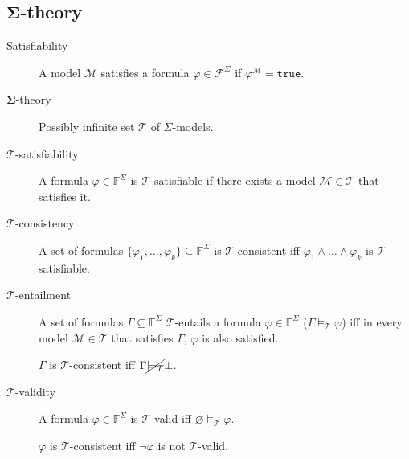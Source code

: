 \subsection{$\mathbf{\Sigma}$-theory}

\begin{description}
    \item[Satisfiability] 
        A model $\mathcal{M}$ satisfies a formula $\varphi \in \mathcal{F}^\Sigma$ if $\varphi^\mathcal{M} = \texttt{true}$.

    \item[$\mathbf{\Sigma}$-theory] 
        Possibly infinite set $\mathcal{T}$ of $\Sigma$-models.

    \item[$\mathbf{\mathcal{T}}$-satisfiability] 
        A formula $\varphi \in \mathbb{F}^\Sigma$ is $\mathcal{T}$-satisfiable if there exists a model $\mathcal{M} \in \mathcal{T}$ that satisfies it.

    \item[$\mathbf{\mathcal{T}}$-consistency] 
        A set of formulas $\{ \varphi_1, \dots, \varphi_k \} \subseteq \mathbb{F}^\Sigma$ is $\mathcal{T}$-consistent iff 
        $\varphi_1 \land \dots \land \varphi_k$ is $\mathcal{T}$-satisfiable.

    \item[$\mathbf{\mathcal{T}}$-entailment] 
        A set of formulas $\Gamma \subseteq \mathbb{F}^\Sigma$ $\mathcal{T}$-entails a formula $\varphi \in \mathbb{F}^\Sigma$ ($\Gamma \models_\mathcal{T} \varphi$) iff
        in every model $\mathcal{M} \in \mathcal{T}$ that satisfies $\Gamma$, $\varphi$ is also satisfied.

        \begin{remark}
            $\Gamma$ is $\mathcal{T}$-consistent iff $\Gamma \cancel{\models_\mathcal{T}} \bot$.
        \end{remark}

    \item[$\mathbf{\mathcal{T}}$-validity] 
        A formula $\varphi \in \mathbb{F}^\Sigma$ is $\mathcal{T}$-valid iff $\varnothing \models_\mathcal{T} \varphi$.

        \begin{remark}
            $\varphi$ is $\mathcal{T}$-consistent iff $\lnot\varphi$ is not $\mathcal{T}$-valid.
        \end{remark}


\end{description}
